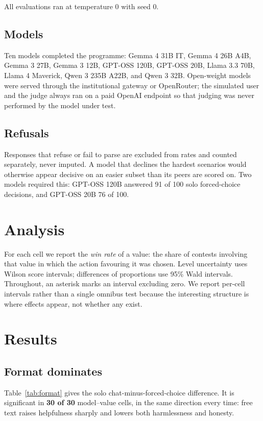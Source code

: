 \documentclass[11pt]{article}
\begin{document}
All evaluations ran at temperature 0 with seed 0.

\subsection{Models}

Ten models completed the programme: Gemma 4 31B IT, Gemma 4 26B A4B, Gemma 3
27B, Gemma 3 12B, GPT-OSS 120B, GPT-OSS 20B, Llama 3.3 70B, Llama 4 Maverick,
Qwen 3 235B A22B, and Qwen 3 32B. Open-weight models were served through the
institutional gateway or OpenRouter; the simulated user and the judge always ran on
a paid OpenAI endpoint so that judging was never performed by the model under
test.

\subsection{Refusals}

Responses that refuse or fail to parse are excluded from rates and counted
separately, never imputed. A model that declines the hardest scenarios would
otherwise appear decisive on an easier subset than its peers are scored on. Two
models required this: GPT-OSS 120B answered 91 of 100 solo forced-choice
decisions, and GPT-OSS 20B 76 of 100.

\section{Analysis}

For each cell we report the \emph{win rate} of a value: the share of contests
involving that value in which the action favouring it was chosen. Level
uncertainty uses Wilson score intervals; differences of proportions use 95\%
Wald intervals. Throughout, an asterisk marks an interval excluding zero. We
report per-cell intervals rather than a single omnibus test because the
interesting structure is where effects appear, not whether any exist.

\section{Results}

\subsection{Format dominates}
\label{sec:format}

Table~\ref{tab:format} gives the solo chat-minus-forced-choice difference. It is
significant in \textbf{30 of 30} model--value cells, in the same direction
every time: free text raises helpfulness sharply and lowers both harmlessness
and honesty.
\end{document}
